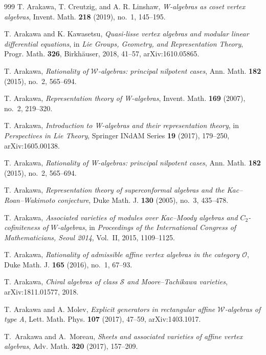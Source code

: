 \begin{thebibliography}{999}
T. Arakawa, T. Creutzig, and A. R. Linshaw, \emph{W-algebras as coset vertex algebras}, Invent. Math. \textbf{218} (2019), no.~1, 145--195.

T. Arakawa and K. Kawasetsu, \emph{Quasi-lisse vertex algebras and modular linear differential equations}, in \emph{Lie Groups, Geometry, and Representation Theory}, Progr. Math. \textbf{326}, Birkh\"auser, 2018, 41--57, arXiv:1610.05865.

T. Arakawa, \emph{Rationality of $\mathcal{W}$-algebras: principal nilpotent cases}, Ann. Math. \textbf{182} (2015), no.~2, 565--694.

T. Arakawa, \emph{Representation theory of W-algebras}, Invent. Math. \textbf{169} (2007), no.~2, 219--320.

T. Arakawa, \emph{Introduction to W-algebras and their representation theory}, in \emph{Perspectives in Lie Theory}, Springer INdAM Series \textbf{19} (2017), 179--250, arXiv:1605.00138.

T. Arakawa, \emph{Rationality of W-algebras: principal nilpotent cases}, Ann. Math. \textbf{182} (2015), no.~2, 565--694.

T. Arakawa, \emph{Representation theory of superconformal algebras and the Kac--Roan--Wakimoto conjecture}, Duke Math. J. \textbf{130} (2005), no.~3, 435--478.

T. Arakawa, \emph{Associated varieties of modules over Kac--Moody algebras and $C_2$-cofiniteness of $W$-algebras}, in \emph{Proceedings of the International Congress of Mathematicians, Seoul 2014}, Vol.~II, 2015, 1109--1125.

T. Arakawa, \emph{Rationality of admissible affine vertex algebras in the category $\mathcal{O}$}, Duke Math. J. \textbf{165} (2016), no.~1, 67--93.

T. Arakawa, \emph{Chiral algebras of class $\mathcal{S}$ and Moore--Tachikawa varieties}, arXiv:1811.01577, 2018.

T. Arakawa and A. Molev, \emph{Explicit generators in rectangular affine $\mathcal{W}$-algebras of type A}, Lett. Math. Phys. \textbf{107} (2017), 47--59, arXiv:1403.1017.

T.~Arakawa and A.~Moreau, \emph{Sheets and associated varieties of affine vertex algebras}, Adv. Math. \textbf{320} (2017), 157--209.


\end{thebibliography}
